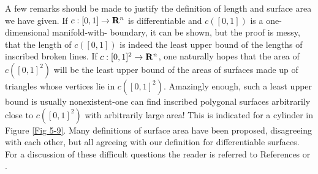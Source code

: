 A few remarks should be made to justify the definition of
length and surface area we have given. If $c:[0,1]\to \mathbf{R}^n$ is
differentiable and $c([0,1])$ is a one-dimensional manifold-with-
boundary, it can be shown, but the proof is messy, that the
length of $c([0,1])$ is indeed the least upper bound of the lengths
of inscribed broken lines. If $c:[0,1]^2\to \mathbf{R}^n$, one naturally
hopes that the area of $c([0,1]^2)$ will be the least upper bound of
the areas of surfaces made up of triangles whose vertices lie in
$c([0,1]^2)$. Amazingly enough, such a least upper bound is
usually nonexistent-one can find inscribed polygonal surfaces
arbitrarily close to $c([0,1]^2)$ with arbitrarily large area! This
is indicated for a cylinder in Figure \ref{Fig 5-9}. Many definitions
of surface area have been proposed, disagreeing with each
other, but all agreeing with our definition for differentiable
surfaces. For a discussion of these difficult questions the
reader is referred to References \cite{cesari1956surface} or \cite{rad61948length}.

